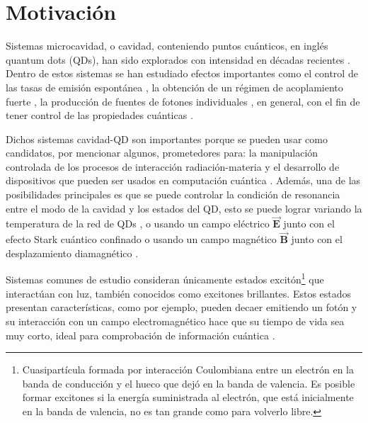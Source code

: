\documentclass[../main.tex]{subfiles}
\begin{document}
\chapter{Motivación}
Sistemas microcavidad, o cavidad, conteniendo puntos cuánticos, en inglés quantum dots (QDs), han sido explorados con intensidad en décadas recientes \parencite{Reitzenstein2012}. Dentro de estos sistemas se han estudiado efectos importantes como el control de las tasas de emisión espontánea \parencite{Bayer2001}, la obtención de un régimen de acoplamiento fuerte \parencite{Reithmaier2004}, la producción de fuentes de fotones individuales \parencite{Michler2000}, en general, con el fin de tener control de las propiedades cuánticas \parencite{Jimenez2017}.

Dichos sistemas cavidad-QD son importantes porque se pueden usar como candidatos, por mencionar algunos, prometedores para: la manipulación controlada de los procesos de interacción radiación-materia y el desarrollo de dispositivos que pueden ser usados en computación cuántica \parencite{Jimenez2017}. Además, una de las posibilidades principales es que se puede controlar la condición de resonancia entre el modo de la cavidad y los estados del QD, esto se puede lograr variando la temperatura de la red de QDs \parencite{Reithmaier2004}, o usando un campo eléctrico  $\vec{\mathbf{E}}$ junto con el efecto Stark cuántico confinado o usando  un campo magnético $\vec{\mathbf{B}}$ junto con el desplazamiento diamagnético \parencite{Jimenez2017}.

Sistemas comunes de estudio consideran únicamente estados excitón\footnote{Cuasipartícula formada por interacción Coulombiana entre un electrón en la banda de conducción y el hueco que dejó en la banda de valencia. Es posible formar excitones si la energía suministrada al electrón, que está inicialmente en la banda de valencia, no es tan grande como para volverlo libre.} que interactúan con luz, también conocidos como excitones brillantes. Estos estados presentan características, como por ejemplo, pueden decaer emitiendo un fotón y su interacción con un campo electromagnético hace que su tiempo de vida sea muy corto, ideal para comprobación de información cuántica \parencite{Poem2010}. 
\end{document}
